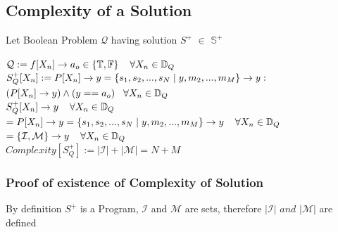 \documentclass[11pt]{article}
\begin{document}
\subsection{Complexity of a Solution}
Let Boolean Problem $\mathcal{Q}$ having solution $S^+$ $\in$ $\mathbb{S}^+$
\begin{center}
\vspace{1mm}
$
\mathcal{Q} := f\lbrack X_n \rbrack \rightarrow a_o \in \{\mathbb{T},\mathbb{F}\} \hspace{4mm} \forall X_n \in \mathbb{D}_{Q}
$
\\ \vspace{6mm}
$
S_Q^+[X_n] := P[X_n] \rightarrow y =\{ s_1,s_2,...,s_{N}\hspace{1mm}|\hspace{1mm} y, m_2,...,m_M\} \rightarrow y :
$
\\ \vspace{2mm}
$
(P[X_n] \rightarrow y) \land (y == a_o) \hspace{3mm} \forall  X_n \in \mathbb{D}_Q
$
\\ \vspace{6mm}
$
S_Q^+[X_n] \rightarrow y  \hspace{4mm} \forall  X_n \in \mathbb{D}_Q
$
\\ \vspace{3mm}
$
= P[X_n] \rightarrow y =\{ s_1,s_2,...,s_{N}\hspace{1mm}|\hspace{1mm} y, m_2,...,m_M\} \rightarrow y \hspace{4mm} \forall  X_n \in \mathbb{D}_Q
$
\\ \vspace{3mm}
$
=\{\mathcal{I}, \mathcal{M} \} \rightarrow y \hspace{4mm} \forall  X_n \in \mathbb{D}_Q
$
\\ \vspace{8mm}
$
Complexity$$[S_Q^+] := |\mathcal{I}| + |\mathcal{M}| = N + M
$
\end{center}
\subsubsection{Proof of existence of Complexity of Solution}
By definition $S^+$ is a Program, $\mathcal{I}$ and $\mathcal{M}$ are sets, therefore $|\mathcal{I}|$ $and$ $|\mathcal{M}|$ are defined
\begin{center}

\end{center}
\end{document}
